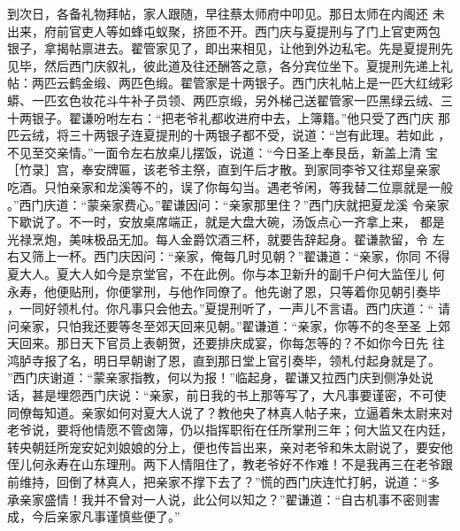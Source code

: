 到次日，各备礼物拜帖，家人跟随，早往蔡太师府中叩见。那日太师在内阁还
未出来，府前官吏人等如蜂屯蚁聚，挤匝不开。西门庆与夏提刑与了门上官吏两包
银子，拿揭帖禀进去。翟管家见了，即出来相见，让他到外边私宅。先是夏提刑先
见毕，然后西门庆叙礼，彼此道及往还酬答之意，各分宾位坐下。夏提刑先递上礼
帖：两匹云鹤金缎、两匹色缎。翟管家是十两银子。西门庆礼帖上是一匹大红绒彩
蟒、一匹玄色妆花斗牛补子员领、两匹京缎，另外梯己送翟管家一匹黑绿云绒、三
十两银子。翟谦吩咐左右：“把老爷礼都收进府中去，上簿籍。”他只受了西门庆
那匹云绒，将三十两银子连夏提刑的十两银子都不受，说道：“岂有此理。若如此
，不见至交亲情。”一面令左右放桌儿摆饭，说道：“今日圣上奉艮岳，新盖上清
宝［竹录］宫，奉安牌匾，该老爷主祭，直到午后才散。到家同李爷又往郑皇亲家
吃酒。只怕亲家和龙溪等不的，误了你每勾当。遇老爷闲，等我替二位禀就是一般
。”西门庆道：“蒙亲家费心。”翟谦因问：“亲家那里住？”西门庆就把夏龙溪
令亲家下歇说了。不一时，安放桌席端正，就是大盘大碗，汤饭点心一齐拿上来，
都是光禄烹炮，美味极品无加。每人金爵饮酒三杯，就要告辞起身。翟谦款留，令
左右又筛上一杯。西门庆因问：“亲家，俺每几时见朝？”翟谦道：“亲家，你同
不得夏大人。夏大人如今是京堂官，不在此例。你与本卫新升的副千户何大监侄儿
何永寿，他便贴刑，你便掌刑，与他作同僚了。他先谢了恩，只等着你见朝引奏毕
，一同好领札付。你凡事只会他去。”夏提刑听了，一声儿不言语。西门庆道：“
请问亲家，只怕我还要等冬至郊天回来见朝。”翟谦道：“亲家，你等不的冬至圣
上郊天回来。那日天下官员上表朝贺，还要排庆成宴，你每怎等的？不如你今日先
往鸿胪寺报了名，明日早朝谢了恩，直到那日堂上官引奏毕，领札付起身就是了。
”西门庆谢道：“蒙亲家指教，何以为报！”临起身，翟谦又拉西门庆到侧净处说
话，甚是埋怨西门庆说：“亲家，前日我的书上那等写了，大凡事要谨密，不可使
同僚每知道。亲家如何对夏大人说了？教他央了林真人帖子来，立逼着朱太尉来对
老爷说，要将他情愿不管卤簿，仍以指挥职衔在任所掌刑三年；何大监又在内廷，
转央朝廷所宠安妃刘娘娘的分上，便也传旨出来，亲对老爷和朱太尉说了，要安他
侄儿何永寿在山东理刑。两下人情阻住了，教老爷好不作难！不是我再三在老爷跟
前维持，回倒了林真人，把亲家不撑下去了？”慌的西门庆连忙打躬，说道：“多
承亲家盛情！我并不曾对一人说，此公何以知之？”翟谦道：“自古机事不密则害
成，今后亲家凡事谨慎些便了。”


